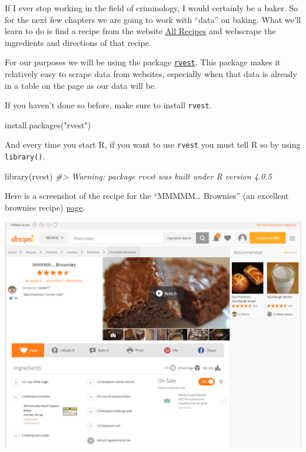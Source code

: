 \documentclass[
  12pt,
  openany]{book}
\newenvironment{Shaded}{\begin{snugshade}}{\end{snugshade}}
\newcommand{\CommentTok}[1]{\textcolor[rgb]{0.37,0.37,0.37}{\textit{#1}}}
\newcommand{\FunctionTok}[1]{\textcolor[rgb]{0,0,0}{#1}}
\newcommand{\NormalTok}[1]{#1}
\newcommand{\StringTok}[1]{\textcolor[rgb]{0.5,0.5,0.5}{#1}}
\begin{document}
If I ever stop working in the field of criminology, I would certainly be a baker. So for the next few chapters we are going to work with ``data'' on baking. What we'll learn to do is find a recipe from the website \href{https://www.allrecipes.com/}{All Recipes} and webscrape the ingredients and directions of that recipe.

For our purposes we will be using the package \href{https://github.com/tidyverse/rvest}{\texttt{rvest}}. This package makes it relatively easy to scrape data from websites, especially when that data is already in a table on the page as our data will be.

If you haven't done so before, make sure to install \texttt{rvest}.

\begin{Shaded}
\begin{Highlighting}[]
\FunctionTok{install.packages}\NormalTok{(}\StringTok{"rvest"}\NormalTok{)}
\end{Highlighting}
\end{Shaded}

And every time you start R, if you want to use \texttt{rvest} you must tell R so by using \texttt{library()}.

\begin{Shaded}
\begin{Highlighting}[]
\FunctionTok{library}\NormalTok{(rvest)}
\CommentTok{\#\textgreater{} Warning: package \textquotesingle{}rvest\textquotesingle{} was built under R version 4.0.5}
\end{Highlighting}
\end{Shaded}

Here is a screenshot of the recipe for the ``MMMMM\ldots{} Brownies'' (an excellent brownies recipe) \href{https://www.allrecipes.com/recipe/25080/mmmmm-brownies/?internalSource=hub\%20recipe\&referringContentType=Search}{page}.

\includegraphics{images/brownies_1.PNG}
\end{document}
